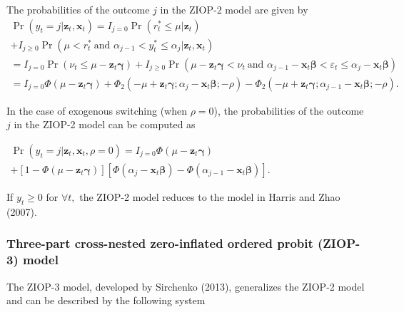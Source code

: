 \documentclass[letterpaper,fleqn,12pt]{article}
\begin{document}
\begin{onehalfspace}
The probabilities of the outcome $j$ in the ZIOP-2 model are given by%
\begin{equation}
\begin{array}{l}
\Pr (y_{t}=j|\mathbf{z}_{t},\mathbf{x}_{t})=I_{j=0}\Pr (r_{t}^{\ast }\leq
\mu |\mathbf{z}_{t}) \\ 
+I_{j\geq 0}\Pr (\mu <r_{t}^{\ast }\ \text{and }\alpha _{j-1}<y_{t}^{\ast
}\leq \alpha _{j}|\mathbf{z}_{t},\mathbf{x}_{t}) \\ 
=I_{j=0}\Pr (\nu _{t}\leq \mu -\mathbf{z}_{t}\mathbf{\gamma })+I_{j\geq
0}\Pr (\mu -\mathbf{z}_{t}\mathbf{\gamma }<\nu _{t}\ \text{and }\alpha
_{j-1}-\mathbf{x}_{t}\mathbf{\beta }<\varepsilon _{t}\leq \alpha _{j}-%
\mathbf{x}_{t}\mathbf{\beta }) \\ 
=I_{j=0}\Phi (\mu -\mathbf{z}_{t}\mathbf{\gamma })+\Phi _{2}(-\mu +\mathbf{z}%
_{t}\mathbf{\gamma };\alpha _{j}-\mathbf{x}_{t}\mathbf{\beta };\mathbf{-}%
\rho )-\Phi _{2}(-\mu +\mathbf{z}_{t}\mathbf{\gamma };\alpha _{j-1}-\mathbf{x%
}_{t}\mathbf{\beta };\mathbf{-}\rho )\text{.}%
\end{array}
\label{Prob MIOP}
\end{equation}

In the case of exogenous switching (when $\rho =0$), the probabilities of
the outcome $j$ in the ZIOP-2 model can be computed as

\begin{center}
$%
\begin{array}{l}
\Pr (y_{t}=j|\mathbf{z}_{t},\mathbf{x}_{t},\rho =0)=I_{j=0}\Phi (\mu -%
\mathbf{z}_{t}\mathbf{\gamma }) \\ 
+[1-\Phi (\mu -\mathbf{z}_{t}\mathbf{\gamma })][\Phi (\alpha _{j}-\mathbf{x}%
_{t}\mathbf{\beta })-\Phi (\alpha _{j-1}-\mathbf{x}_{t}\mathbf{\beta })]%
\text{.}%
\end{array}%
$
\end{center}

If $y_{t}\geq 0$ for $\forall t,$ the ZIOP-2 model reduces to the model in
Harris and Zhao (2007).

\subsubsection*{Three-part cross-nested zero-inflated ordered probit
(ZIOP-3) model}

The ZIOP-3 model, developed by Sirchenko (2013), generalizes the ZIOP-2
model and can be described by the following system

\medskip


\end{onehalfspace}
\end{document}

